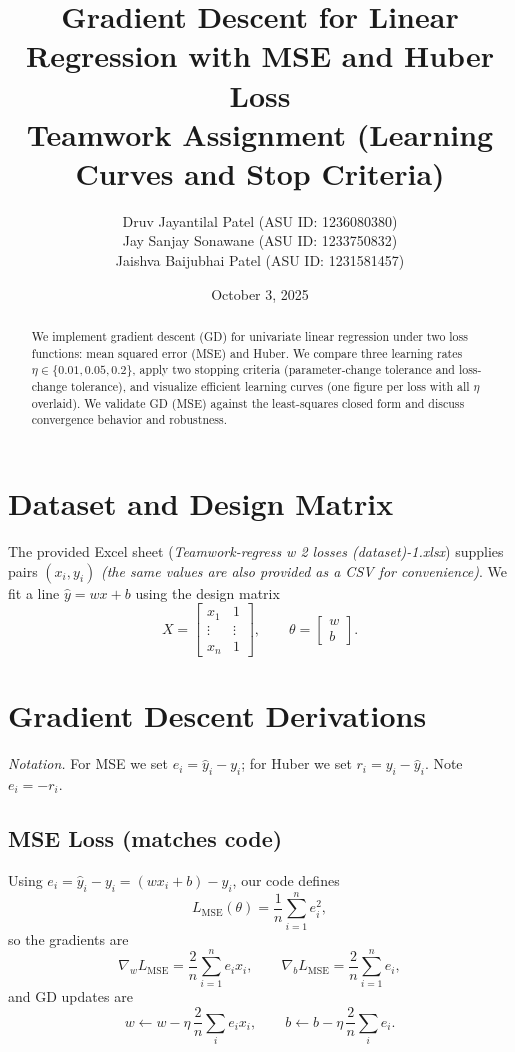 \documentclass[11pt]{article}
\title{Gradient Descent for Linear Regression with MSE and Huber Loss\\
\large Teamwork Assignment (Learning Curves and Stop Criteria)}
\author{
  Druv Jayantilal Patel (ASU ID: 1236080380)\\
  Jay Sanjay Sonawane (ASU ID: 1233750832)\\
  Jaishva Baijubhai Patel (ASU ID: 1231581457)
}
\date{October 3, 2025}
\begin{document}
\maketitle

\begin{abstract}
We implement gradient descent (GD) for univariate linear regression under two loss functions: mean squared error (MSE) and Huber. We compare three learning rates $\eta\in\{0.01, 0.05, 0.2\}$, apply two stopping criteria (parameter-change tolerance and loss-change tolerance), and visualize efficient learning curves (one figure per loss with all $\eta$ overlaid). We validate GD (MSE) against the least-squares closed form and discuss convergence behavior and robustness.
\end{abstract}

\section{Dataset and Design Matrix}
The provided Excel sheet (\emph{Teamwork-regress w 2 losses (dataset)-1.xlsx}) supplies pairs $(x_i,y_i)$ \textit{(the same values are also provided as a CSV for convenience)}. We fit a line $\hat y = w x + b$ using the design matrix
\[
X=\begin{bmatrix}
x_1 & 1\\
\vdots & \vdots\\
x_n & 1
\end{bmatrix},\qquad
\theta=\begin{bmatrix} w\\ b \end{bmatrix}.
\]

\section{Gradient Descent Derivations}
\noindent\textit{Notation.} For MSE we set $e_i=\hat y_i-y_i$; for Huber we set $r_i=y_i-\hat y_i$. Note $e_i=-r_i$.

\subsection{MSE Loss (matches code)}
Using $e_i=\hat y_i-y_i=(wx_i+b)-y_i$, our code defines
\[
L_{\mathrm{MSE}}(\theta)=\frac{1}{n}\sum_{i=1}^n e_i^2,
\]
so the gradients are
\[
\nabla_w L_{\mathrm{MSE}}=\frac{2}{n}\sum_{i=1}^n e_i x_i,\qquad
\nabla_b L_{\mathrm{MSE}}=\frac{2}{n}\sum_{i=1}^n e_i,
\]
and GD updates are
\[
w \leftarrow w - \eta \,\frac{2}{n}\sum_i e_i x_i,\qquad
b \leftarrow b - \eta \,\frac{2}{n}\sum_i e_i.
\]
\end{document}
